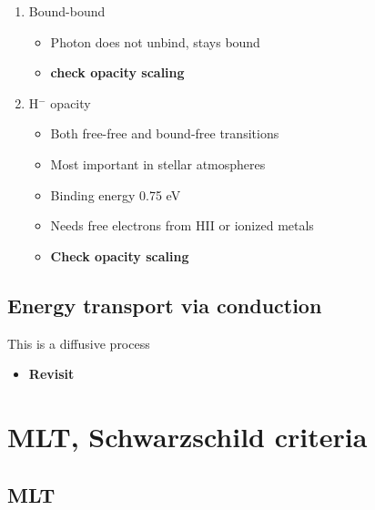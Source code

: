 \documentclass{article}
\begin{document}
\begin{enumerate}
    \begin{itemize}
        \item Photon absorption by bound electrons

        \item Photons are energetic enough to unbind electrons

        \item $\kappa_{bf} \approx 10^{25}Z(1+x)\rho T^{-3.5}$

        \item Below $T\sim 10^4$K, photons are not energetic enough to unbind electrons
    \end{itemize}

    \item Bound-bound

    \begin{itemize}
        \item Photon does not unbind, stays bound

        \item \textbf{check opacity scaling}  
    \end{itemize}

    \item H$^-$ opacity
    \begin{itemize}
        \item Both free-free and bound-free transitions

        \item Most important in stellar atmospheres

        \item Binding energy 0.75 eV

        \item Needs free electrons from HII or ionized metals

        \item \textbf{Check opacity scaling}
    \end{itemize}
\end{enumerate}

\subsection{Energy transport via conduction}
This is a diffusive process

\begin{itemize}
    \item \textbf{Revisit}
\end{itemize}

\section{MLT, Schwarzschild criteria}

\subsection{MLT}
\end{document}

